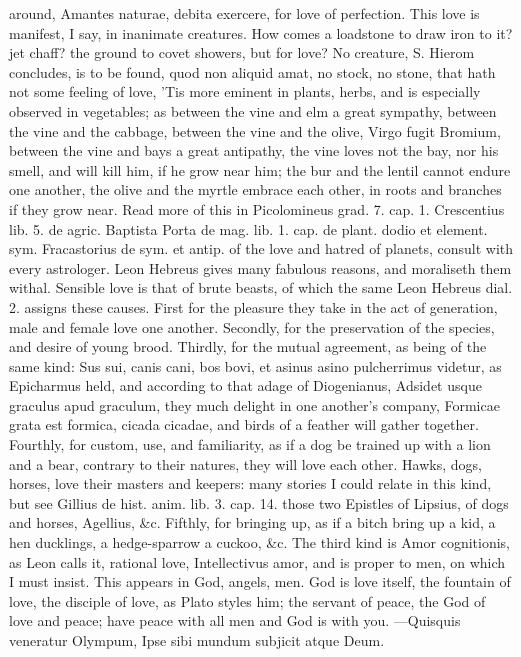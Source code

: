 {around, Amantes naturae, debita exercere, for love of perfection.
This love is manifest, I say, in inanimate creatures. How comes a
loadstone to draw iron to it? jet chaff? the ground to covet showers,
but for love? No creature, S. Hierom concludes, is to be found, quod
non aliquid amat, no stock, no stone, that hath not some feeling of
love, 'Tis more eminent in plants, herbs, and is especially observed in
vegetables; as between the vine and elm a great sympathy, between the
vine and the cabbage, between the vine and the olive,  Virgo
fugit Bromium, between the vine and bays a great antipathy, the vine
loves not the bay, nor his smell, and will kill him, if he grow
near him; the bur and the lentil cannot endure one another, the olive
and the myrtle embrace each other, in roots and branches if they
grow near. Read more of this in Picolomineus grad. 7. cap. 1.
Crescentius lib. 5. de agric. Baptista Porta de mag. lib. 1. cap. de
plant. dodio et element. sym. Fracastorius de sym. et antip. of the
love and hatred of planets, consult with every astrologer. Leon Hebreus
gives many fabulous reasons, and moraliseth them withal.
Sensible love is that of brute beasts, of which the same Leon Hebreus
dial. 2. assigns these causes. First for the pleasure they take in the
act of generation, male and female love one another. Secondly, for the
preservation of the species, and desire of young brood. Thirdly, for
the mutual agreement, as being of the same kind: Sus sui, canis cani,
bos bovi, et asinus asino pulcherrimus videtur, as Epicharmus held, and
according to that adage of Diogenianus, Adsidet usque graculus apud
graculum, they much delight in one another's company, Formicae
grata est formica, cicada cicadae, and birds of a feather will gather
together. Fourthly, for custom, use, and familiarity, as if a dog be
trained up with a lion and a bear, contrary to their natures, they will
love each other. Hawks, dogs, horses, love their masters and keepers:
many stories I could relate in this kind, but see Gillius de hist.
anim. lib. 3. cap. 14. those two Epistles of Lipsius, of dogs and
horses, Agellius, \&c. Fifthly, for bringing up, as if a bitch bring up
a kid, a hen ducklings, a hedge-sparrow a cuckoo, \&c.
The third kind is Amor cognitionis, as Leon calls it, rational love,
Intellectivus amor, and is proper to men, on which I must insist. This
appears in God, angels, men. God is love itself, the fountain of love,
the disciple of love, as Plato styles him; the servant of peace, the
God of love and peace; have peace with all men and God is with you.
---Quisquis veneratur Olympum,
Ipse sibi mundum subjicit atque Deum.

}
